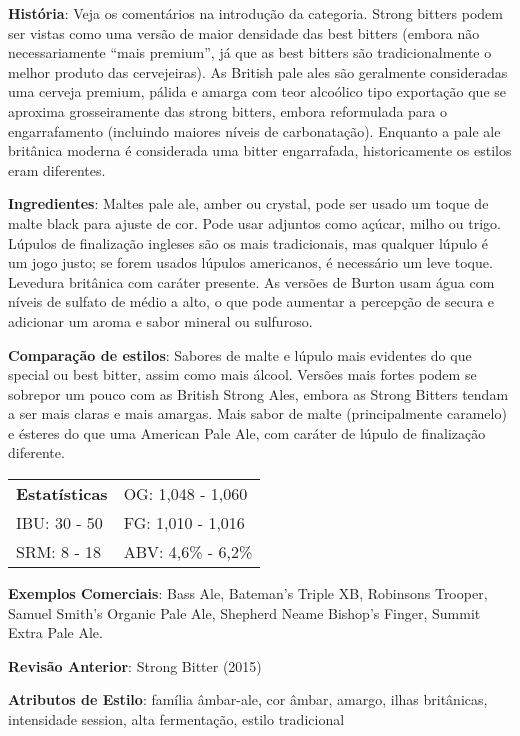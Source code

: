 \textbf{História}: Veja os comentários na introdução da categoria. Strong bitters podem ser vistas como uma versão de maior densidade das best bitters (embora não necessariamente “mais premium”, já que as best bitters são tradicionalmente o melhor produto das cervejeiras). As British pale ales são geralmente consideradas uma cerveja premium, pálida e amarga com teor alcoólico tipo exportação que se aproxima grosseiramente das strong bitters, embora reformulada para o engarrafamento (incluindo maiores níveis de carbonatação). Enquanto a pale ale britânica moderna é considerada uma bitter engarrafada, historicamente os estilos eram diferentes.

\textbf{Ingredientes}: Maltes pale ale, amber ou crystal, pode ser usado um toque de malte black para ajuste de cor. Pode usar adjuntos como açúcar, milho ou trigo. Lúpulos de finalização ingleses são os mais tradicionais, mas qualquer lúpulo é um jogo justo; se forem usados lúpulos americanos, é necessário um leve toque. Levedura britânica com caráter presente. As versões de Burton usam água com níveis de sulfato de médio a alto, o que pode aumentar a percepção de secura e adicionar um aroma e sabor mineral ou sulfuroso.

\textbf{Comparação de estilos}: Sabores de malte e lúpulo mais evidentes do que special ou best bitter, assim como mais álcool. Versões mais fortes podem se sobrepor um pouco com as British Strong Ales, embora as Strong Bitters tendam a ser mais claras e mais amargas. Mais sabor de malte (principalmente caramelo) e ésteres do que uma American Pale Ale, com caráter de lúpulo de finalização diferente.

\begin{tabular}{@{}p{35mm}p{35mm}@{}}
  \textbf{Estatísticas} & OG: 1,048 - 1,060 \\
  IBU: 30 - 50  & FG: 1,010 - 1,016  \\
  SRM: 8 - 18  & ABV: 4,6\% - 6,2\%
\end{tabular}

\textbf{Exemplos Comerciais}: Bass Ale, Bateman’s Triple XB, Robinsons Trooper, Samuel Smith’s Organic Pale Ale, Shepherd Neame Bishop's Finger, Summit Extra Pale Ale.

\textbf{Revisão Anterior}: Strong Bitter (2015)

\textbf{Atributos de Estilo}: família âmbar-ale, cor âmbar, amargo, ilhas britânicas, intensidade session, alta fermentação, estilo tradicional